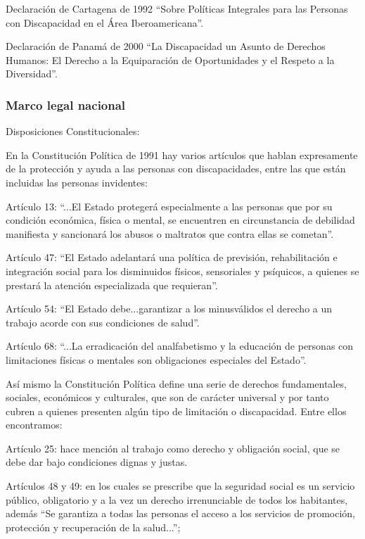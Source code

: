 \documentclass[a4paper, 12pt, oneside]{article}
\begin{document}
	Declaración de Cartagena de 1992 “Sobre Políticas Integrales para las Personas con Discapacidad en el Área Iberoamericana”.

	Declaración de Panamá de 2000 “La Discapacidad un Asunto de Derechos Humanos: El Derecho a la Equiparación de Oportunidades y el Respeto a la Diversidad”.

	\subsubsection{Marco legal nacional}

	Disposiciones Constitucionales:

	En la Constitución Política de 1991 hay varios artículos que hablan expresamente de la protección y ayuda a las personas con discapacidades, entre las que están incluidas las personas invidentes:

	Artículo 13: “...El Estado protegerá especialmente a las personas que por su condición económica, física o mental, se encuentren en circunstancia de debilidad manifiesta y sancionará los abusos o maltratos que contra ellas se cometan”.

	Artículo 47: “El Estado adelantará una política de previsión, rehabilitación e integración social para los disminuidos físicos, sensoriales y psíquicos, a quienes se prestará la atención especializada que requieran”.

	Artículo 54: “El Estado debe...garantizar a los minusválidos el derecho a un trabajo acorde con sus condiciones de salud”.

	Artículo 68: “...La erradicación del analfabetismo y la educación de personas con limitaciones físicas o mentales son obligaciones especiales del Estado”.

	Así mismo la Constitución Política define una serie de derechos fundamentales, sociales, económicos y culturales, que son de carácter universal y por tanto cubren a quienes presenten algún tipo de limitación o discapacidad. Entre ellos encontramos:

	Artículo 25: hace mención al trabajo como derecho y obligación social, que se debe dar bajo condiciones dignas y justas.

	Artículos 48 y 49: en los cuales se prescribe que la seguridad social es un servicio público, obligatorio y a la vez un derecho irrenunciable de todos los habitantes, además “Se garantiza a todas las personas el acceso a los servicios de promoción, protección y recuperación de la salud...”;
\end{document}
